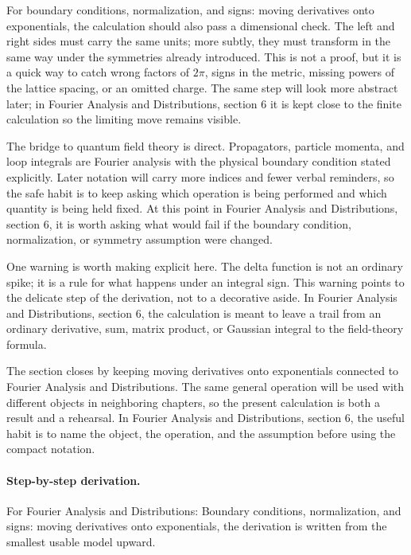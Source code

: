 For boundary conditions, normalization, and signs: moving derivatives onto exponentials, the calculation should also pass a dimensional check.  The left and right sides must carry the same units; more subtly, they must transform in the same way under the symmetries already introduced.  This is not a proof, but it is a quick way to catch wrong factors of \(2\pi\), signs in the metric, missing powers of the lattice spacing, or an omitted charge.  The same step will look more abstract later; in Fourier Analysis and Distributions, section 6 it is kept close to the finite calculation so the limiting move remains visible.

The bridge to quantum field theory is direct.  Propagators, particle momenta, and loop integrals are Fourier analysis with the physical boundary condition stated explicitly.  Later notation will carry more indices and fewer verbal reminders, so the safe habit is to keep asking which operation is being performed and which quantity is being held fixed.  At this point in Fourier Analysis and Distributions, section 6, it is worth asking what would fail if the boundary condition, normalization, or symmetry assumption were changed.

One warning is worth making explicit here.  The delta function is not an ordinary spike; it is a rule for what happens under an integral sign.  This warning points to the delicate step of the derivation, not to a decorative aside.  In Fourier Analysis and Distributions, section 6, the calculation is meant to leave a trail from an ordinary derivative, sum, matrix product, or Gaussian integral to the field-theory formula.

The section closes by keeping moving derivatives onto exponentials connected to Fourier Analysis and Distributions.  The same general operation will be used with different objects in neighboring chapters, so the present calculation is both a result and a rehearsal.  In Fourier Analysis and Distributions, section 6, the useful habit is to name the object, the operation, and the assumption before using the compact notation.



\paragraph{Step-by-step derivation.}

For Fourier Analysis and Distributions: Boundary conditions, normalization, and signs: moving derivatives onto exponentials, the derivation is written from the smallest usable model upward.

